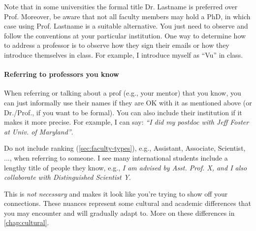 \documentclass[oneside,11pt,dvipsnames]{book}
\newcommand{\mycomment}[3][\color{blue}]{{#1{{#2}: {#3}}}}
\newcommand{\tvn}[1]{\mycomment{TVN}{#1}}{}
\begin{document}
Note that in some universities the formal title Dr. Lastname is preferred over Prof. Moreover, be aware that not all faculty members may hold a PhD, in which case using Prof. Lastname is a suitable alternative. 	You just need to observe and follow the conventions at your particular institution. One way to determine how to address a professor is to observe how they sign their emails or how they introduce themselves in class. For example, I introduce myself as ``Vu'' in class.



\paragraph{Referring to professors you know} When referring or talking about a prof (e.g., your mentor) that you know, you can just informally use their names if they are OK with it as mentioned above (or Dr./Prof., if you want to be formal). You can also include their institution if it makes it more precise.  For example, I can say:  \emph{``I did my postdoc with Jeff Foster at Univ. of Maryland''}.

Do not include ranking (\autoref{sec:faculty-types}), e.g., Assistant, Associate, Scientist, ..., when referring to someone. I see many international students include a lengthy title of people they know, e.g., \emph{I am advised by Asst. Prof. X, and I also collaborate with Distinguished Scientist Y}.  

This is \emph{not necessary} and makes it look like you're trying to show off your connections. These nuances represent some cultural and academic differences that you may encounter and will gradually adapt to. More on these differences in \autoref{chap:cultural}.



\end{document}
